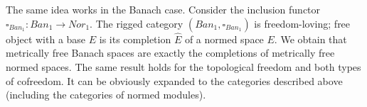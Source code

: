 \documentclass[a0b,landscape]{a0poster}
\begin{document}
\begin{multicols}{4}
The same idea works in the Banach case. Consider the inclusion functor $\square_{Ban_1}: Ban_1\to Nor_1$. The rigged category $(Ban_1, \square_{Ban_1})$ is freedom-loving; free
object with a base $E$ is its completion $\widehat{E}$ of a normed space $E$. We obtain that metrically free Banach spaces are exactly the completions of metrically free normed 
spaces. The same result holds for the topological freedom and both types of cofreedom. It can be obviously expanded to the categories described above (including the 
categories of normed modules).

\end{multicols}
\end{document}
